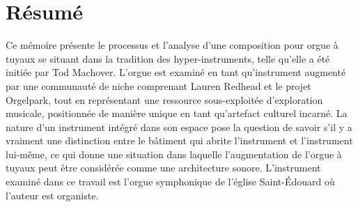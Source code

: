 \documentclass[12pt,twoside,maitrise]{dms_ks}
\theoremstyle{definition}
\begin{document}

\maketitle

\maketitle


\francais

\chapter*{Résumé}

Ce mémoire présente le processus et l'analyse d'une composition pour orgue à tuyaux se situant dans la tradition des hyper-instruments, telle qu'elle a été initiée par Tod Machover. 
L'orgue est examiné en tant qu'instrument augmenté par une communauté de niche comprenant Lauren Redhead et le projet Orgelpark, tout en représentant une ressource sous-exploitée d'exploration musicale, positionnée de manière unique en tant qu'artefact culturel incarné. 
La nature d'un instrument intégré dans son espace pose la question de savoir s'il y a vraiment une distinction entre le bâtiment qui abrite l'instrument et l'instrument lui-même, ce qui donne une situation dans laquelle l'augmentation de l'orgue à tuyaux peut être considérée comme une architecture sonore. 
L'instrument examiné dans ce travail est l'orgue symphonique de l’église Saint-Édouard où l'auteur est organiste. 
\end{document}
